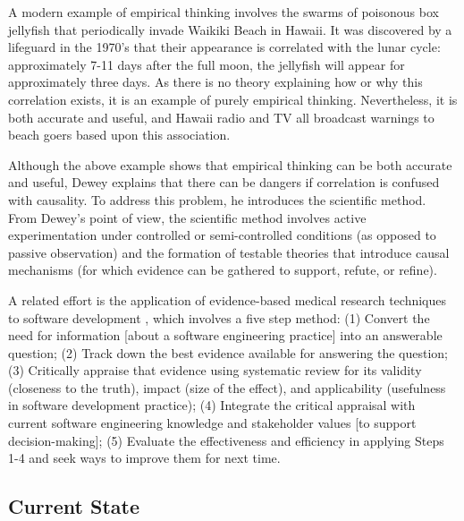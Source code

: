 A modern example of empirical thinking involves the swarms of poisonous box
jellyfish that periodically invade Waikiki Beach in Hawaii.  It was
discovered by a lifeguard in the 1970's that their appearance is correlated
with the lunar cycle: approximately 7-11 days after the full moon, the
jellyfish will appear for approximately three days.  As there is no
theory explaining how or why this correlation exists, it is an example of
purely empirical thinking.  Nevertheless, it is both accurate and useful,
and Hawaii radio and TV all broadcast warnings to beach goers based upon
this association.

Although the above example shows that empirical thinking can be
both accurate and useful, Dewey explains that there can be dangers if
correlation is confused with causality. To address this problem, he
introduces the scientific method.  From Dewey's point of view, the
scientific method involves active experimentation under controlled or
semi-controlled conditions (as opposed to passive observation) and the
formation of testable theories that introduce causal mechanisms (for which
evidence can be gathered to support, refute, or refine).  

A related effort is the application of evidence-based medical research
techniques to software development \citep{Kitchenham04,Kitchenham04a},
which involves a five step method: (1) Convert the need for information
[about a software engineering practice] into an answerable question; (2)
Track down the best evidence available for answering the question; (3)
Critically appraise that evidence using systematic review for its validity
(closeness to the truth), impact (size of the effect), and applicability
(usefulness in software development practice); (4) Integrate the critical
appraisal with current software engineering knowledge and stakeholder
values [to support decision-making]; (5) Evaluate the effectiveness and
efficiency in applying Steps 1-4 and seek ways to improve them for next
time.  


\subsection{Current State}
\label{sec:current-state}


